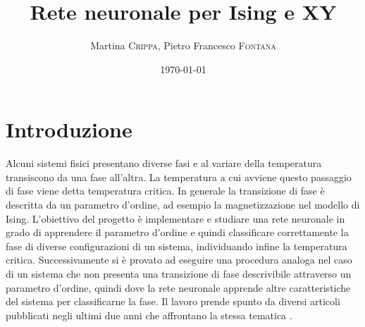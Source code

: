 \documentclass{article}
\title{Rete neuronale per Ising e XY} %
\author{Martina \textsc{Crippa}, Pietro Francesco \textsc{Fontana}} %
\date{\today} %
\begin{document}
\maketitle %




\section{Introduzione}
Alcuni sistemi fisici presentano diverse fasi e al variare della temperatura transiscono da una fase all'altra. La temperatura a cui avviene questo passaggio di fase viene detta temperatura critica. In generale la transizione di fase è descritta da un parametro d'ordine, ad esempio la magnetizzazione nel modello di Ising. L'obiettivo del progetto è implementare e studiare una rete neuronale in grado di apprendere il parametro d'ordine e quindi classificare correttamente la fase di diverse configurazioni di un sistema, individuando infine la temperatura critica. Successivamente si è provato ad eseguire una procedura analoga nel caso di un sistema che non presenta una transizione di fase descrivibile attraverso un parametro d'ordine, quindi dove la rete neuronale apprende altre caratteristiche del sistema per classificarne la fase.
Il lavoro prende spunto da diversi articoli pubblicati negli ultimi due anni che affrontano la stessa tematica \cite{carrasqu,melko,wessel}.

\end{document}
